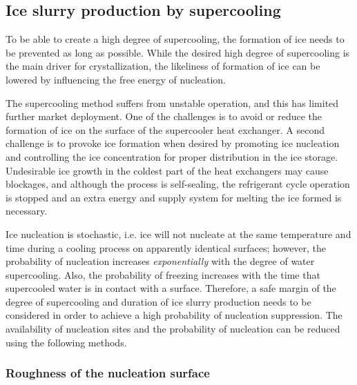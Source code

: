 \subsection{Ice slurry production by supercooling}
\label{section_lit_review_supercooling_theory}

To be able to create a high degree of supercooling, the formation of ice needs to be prevented as long as possible. While the desired high degree of supercooling is the main driver for crystallization, the likeliness of formation of ice can be lowered by influencing the free energy of nucleation. 

The supercooling method suffers from unstable operation, and this has limited further market deployment. 
One of the challenges is to avoid or reduce the formation of ice on the surface of the supercooler heat exchanger. 
A second challenge is to provoke ice formation when desired by promoting ice nucleation \citep{beaupere_nucleation_2018} and controlling the ice concentration for proper distribution in the ice storage.
Undesirable ice growth in the coldest part of the heat exchangers may cause blockages, and although the process is self-sealing, the refrigerant cycle operation is stopped and an extra energy and supply system for melting the ice formed is necessary. 

Ice nucleation is stochastic, i.e. ice will not nucleate at the same temperature and time during a cooling process on apparently identical surfaces; however, the probability of nucleation increases {\em exponentially} with the degree of water supercooling. Also, the probability of freezing increases with the time that supercooled water is in contact with a surface. 
Therefore, a safe margin of the degree of supercooling and duration of ice slurry production needs to be considered in order to achieve a high probability of nucleation suppression.
The availability of nucleation sites and the probability of nucleation can be reduced using the following methods. 

\subsubsection{Roughness of the nucleation surface}

